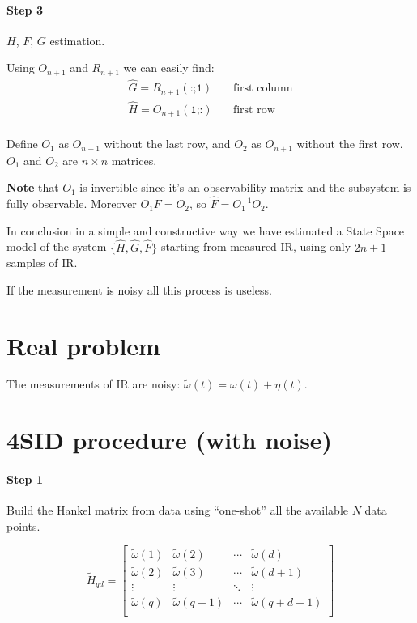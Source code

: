 \paragraph{Step 3} $H$, $F$, $G$ estimation.

Using $O_{n+1}$ and $R_{n+1}$ we can easily find:
\begin{align*}
    \hat{G} = R_{n+1}(\texttt{:;1}) & \quad\text{first column} \\
    \hat{H} = O_{n+1}(\texttt{1;:}) & \quad\text{first row} \\
\end{align*}

Define $O_1$ as $O_{n+1}$ without the last row, and $O_2$ as $O_{n+1}$ without the first row.
$O_1$ and $O_2$ are $n\times n$ matrices.

\textbf{Note} that $O_1$ is invertible since it's an observability matrix and the subsystem is fully observable.
Moreover $O_1F = O_2$, so $\hat{F} = O_1^{-1}O_2$.

In conclusion in a simple and constructive way we have estimated a State Space model of the system $\{\hat{H}, \hat{G}, \hat{F}\}$ starting from measured IR, using only $2n+1$ samples of IR.

\begin{remark}
    If the measurement is noisy all this process is useless.
\end{remark}

\section{Real problem}

The measurements of IR are noisy: $\tilde{\omega}(t) = \omega(t) + \eta(t)$.



\section{4SID procedure (with noise)}

\paragraph{Step 1} Build the Hankel matrix from data using ``one-shot'' all the available $N$ data points.

\[
    \tilde{H}_{qd} = \begin{bmatrix}
        \tilde{\omega}(1) & \tilde{\omega}(2) & \cdots & \tilde{\omega}(d) \\
        \tilde{\omega}(2) & \tilde{\omega}(3) & \cdots & \tilde{\omega}(d+1) \\
        \vdots            & \vdots            & \ddots & \vdots \\
        \tilde{\omega}(q) & \tilde{\omega}(q+1) & \cdots & \tilde{\omega}(q+d-1) \\
    \end{bmatrix}
\]

